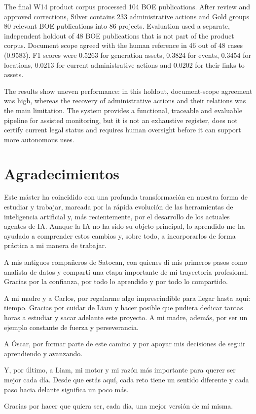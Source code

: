 The final W14 product corpus processed 104 BOE publications. After review and
approved corrections, Silver contains 233 administrative actions and Gold
groups 80 relevant BOE publications into 86 projects. Evaluation used a
separate, independent holdout of 48 BOE publications that is not part of the
product corpus. Document scope agreed with the human reference in 46 out of 48
cases (0.9583). F1 scores were 0.5263 for generation assets, 0.3824 for events,
0.3454 for locations, 0.0213 for current administrative actions and 0.0202 for
their links to assets.

The results show uneven performance: in this holdout, document-scope agreement
was high, whereas the recovery of administrative actions and their relations
was the main limitation. The system provides a functional, traceable
and evaluable pipeline for assisted monitoring, but it is not an exhaustive
register, does not certify current legal status and requires human oversight
before it can support more autonomous uses.

\chapter*{Agradecimientos}
Este máster ha coincidido con una profunda transformación en nuestra forma de
estudiar y trabajar, marcada por la rápida evolución de las herramientas de
inteligencia artificial y, más recientemente, por el desarrollo de los actuales
agentes de IA. Aunque la IA no ha sido su objeto principal, lo aprendido me ha
ayudado a comprender estos cambios y, sobre todo, a incorporarlos de forma
práctica a mi manera de trabajar.

A mis antiguos compañeros de Satocan, con quienes di mis primeros pasos como
analista de datos y compartí una etapa importante de mi trayectoria profesional.
Gracias por la confianza, por todo lo aprendido y por todo lo compartido.

A mi madre y a Carlos, por regalarme algo imprescindible para llegar hasta aquí:
tiempo. Gracias por cuidar de Liam y hacer posible que pudiera dedicar tantas
horas a estudiar y sacar adelante este proyecto. A mi madre, además, por ser un
ejemplo constante de fuerza y perseverancia.

A Óscar, por formar parte de este camino y por apoyar mis decisiones de seguir
aprendiendo y avanzando.

Y, por último, a Liam, mi motor y mi razón más importante para querer ser mejor
cada día. Desde que estás aquí, cada reto tiene un sentido diferente y cada paso
hacia delante significa un poco más.

Gracias por hacer que quiera ser, cada día, una mejor versión de mí misma.
